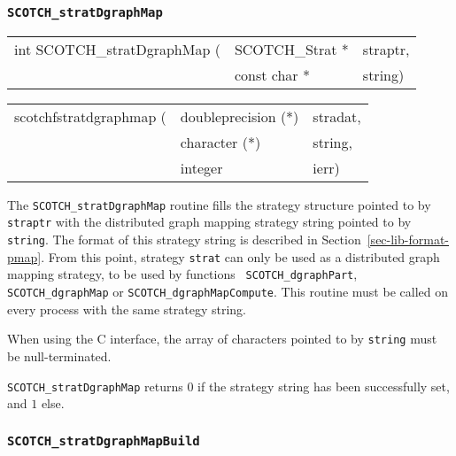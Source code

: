 \subsubsection{{\tt SCOTCH\_stratDgraphMap}}

\begin{itemize}
\progsyn

{\tt\begin{tabular}{l@{}ll}
int SCOTCH\_stratDgraphMap ( & SCOTCH\_Strat * & straptr, \\
                             & const char *    & string)
\end{tabular}}

{\tt\begin{tabular}{l@{}ll}
scotchfstratdgraphmap ( & doubleprecision (*) & stradat, \\
                        & character (*)       & string,  \\
                        & integer             & ierr)
\end{tabular}}

\progdes

The {\tt SCOTCH\_stratDgraphMap} routine fills the strategy
structure pointed to by {\tt straptr} with the distributed graph
mapping strategy string pointed to by {\tt string}. The format of this
strategy string is described in Section~\ref{sec-lib-format-pmap}.
From this point, strategy {\tt strat} can only be used as a
distributed graph mapping strategy, to be used by functions {\tt
SCOTCH\_\lbt dgraph\lbt Part}, {\tt SCOTCH\_\lbt dgraph\lbt Map} or
{\tt SCOTCH\_\lbt dgraph\lbt Map\lbt Compute}. This routine must be
called on every process with the same strategy string.

When using the C interface, the array of characters pointed to by
{\tt string} must be null-terminated.

\progret

{\tt SCOTCH\_stratDgraphMap} returns $0$ if the strategy string
has been successfully set, and $1$ else.
\end{itemize}

\subsubsection{{\tt SCOTCH\_stratDgraphMapBuild}}

